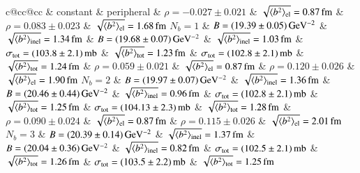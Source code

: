 \begin{table}
\caption{%
Parameters derived from the parameter-comparison fits presented in Figures~\ref{fig:fits common con} and \ref{fig:fits common per}. The rows correspond to different numbers of parameters in the nuclear modulus exponent. The left-hand (right-hand) side columns refer to fits with constant, Eq.~(\ref{eq:nuc phase con}), (peripheral, Eq.~\ref{eq:nuc phase per}) nuclear phase. The RMS values of impact parameter $b$ correspond to elastic (el), inelastic (inel) and any (tot) collisions.
}%
\vskip-3mm
\label{tab:fits common}
\begin{center}
\small
\setlength{\tabcolsep}{5pt}
\begin{tabular}{c@{\hskip20pt}cc@{\hskip20pt}cc}
\hline
\hline
	& \hfil constant \hfil & \hfil peripheral \hfil  \cr
\hline
 			& $\rho = -0.027 \pm 0.021$ & $\sqrt{\langle b^2\rangle_{\rm el}} = 0.87\,{\rm fm}$					& $\rho = 0.083 \pm 0.023$ & $\sqrt{\langle b^2\rangle_{\rm el}} = 1.68\,{\rm fm}$					\cr
$N_b = 1$	& $B = (19.39 \pm 0.05)\,{\rm GeV^{-2}}$ & $\sqrt{\langle b^2\rangle_{\rm inel}} = 1.34\,{\rm fm}$		& $B = (19.68 \pm 0.07)\,{\rm GeV^{-2}}$ & $\sqrt{\langle b^2\rangle_{\rm inel}} = 1.03\,{\rm fm}$		\cr
			& $\sigma_{\rm tot} = (103.8 \pm 2.1)\,{\rm mb}$ & $\sqrt{\langle b^2\rangle_{\rm tot}} = 1.23\,{\rm fm}$	& $\sigma_{\rm tot} = (102.8 \pm 2.1)\,{\rm mb}$ & $\sqrt{\langle b^2\rangle_{\rm tot}} = 1.24\,{\rm fm}$	\cr\hline
%                                                                                                                                                                                                                   
 			& $\rho = 0.059 \pm 0.021$ & $\sqrt{\langle b^2\rangle_{\rm el}} = 0.87\,{\rm fm}$						& $\rho = 0.120 \pm 0.026$ & $\sqrt{\langle b^2\rangle_{\rm el}} = 1.90\,{\rm fm}$						\cr
$N_b = 2$	& $B = (19.97 \pm 0.07)\,{\rm GeV^{-2}}$ & $\sqrt{\langle b^2\rangle_{\rm inel}} = 1.36\,{\rm fm}$		& $B = (20.46 \pm 0.44)\,{\rm GeV^{-2}}$ & $\sqrt{\langle b^2\rangle_{\rm inel}} = 0.96\,{\rm fm}$		\cr
			& $\sigma_{\rm tot} = (102.8 \pm 2.1)\,{\rm mb}$ & $\sqrt{\langle b^2\rangle_{\rm tot}} = 1.25\,{\rm fm}$	& $\sigma_{\rm tot} = (104.13 \pm 2.3)\,{\rm mb}$ & $\sqrt{\langle b^2\rangle_{\rm tot}} = 1.28\,{\rm fm}$	\cr\hline
%                                                                                                                                                                                                                   
 			& $\rho = 0.090 \pm 0.024$ & $\sqrt{\langle b^2\rangle_{\rm el}} = 0.87\,{\rm fm}$						& $\rho = 0.115 \pm 0.026$ & $\sqrt{\langle b^2\rangle_{\rm el}} = 2.01\,{\rm fm}$						\cr
$N_b = 3$	& $B = (20.39 \pm 0.14)\,{\rm GeV^{-2}}$ & $\sqrt{\langle b^2\rangle_{\rm inel}} = 1.37\,{\rm fm}$		& $B = (20.04 \pm 0.36)\,{\rm GeV^{-2}}$ & $\sqrt{\langle b^2\rangle_{\rm inel}} = 0.82\,{\rm fm}$		\cr
			& $\sigma_{\rm tot} = (102.5 \pm 2.1)\,{\rm mb}$ & $\sqrt{\langle b^2\rangle_{\rm tot}} = 1.26\,{\rm fm}$	& $\sigma_{\rm tot} = (103.5 \pm 2.2)\,{\rm mb}$ & $\sqrt{\langle b^2\rangle_{\rm tot}} = 1.25\,{\rm fm}$	\cr\hline
\hline
\end{tabular}
\end{center}
\end{table}



